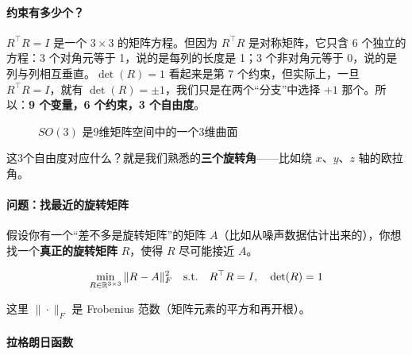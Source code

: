 \paragraph{约束有多少个？}

$R^\top R = I$ 是一个 $3 \times 3$ 的矩阵方程。但因为 $R^\top R$ 是对称矩阵，它只含 6 个独立的方程：3 个对角元等于 1，说的是每列的长度是 1；3 个非对角元等于 0，说的是列与列相互垂直。$\det(R) = 1$ 看起来是第 7 个约束，但实际上，一旦 $R^\top R = I$，就有 $\det(R) = \pm 1$，我们只是在两个“分支”中选择 $+1$ 那个。所以：\textbf{9 个变量，6 个约束，3 个自由度}。

\begin{figure}[htbp]
\centering
{}
\caption{$SO(3)$ 是9维矩阵空间中的一个3维曲面}
\end{figure}

这3个自由度对应什么？就是我们熟悉的\textbf{三个旋转角}——比如绕 $x$、$y$、$z$ 轴的欧拉角。

\paragraph{问题：找最近的旋转矩阵}

假设你有一个“差不多是旋转矩阵”的矩阵 $A$（比如从噪声数据估计出来的），你想找一个\textbf{真正的旋转矩阵} $R$，使得 $R$ 尽可能接近 $A$。

\begin{equation}
\min_{R \in \mathbb{R}^{3 \times 3}} \|R - A\|_F^2 \quad \text{s.t.} \quad R^\top R = I, \quad \det(R) = 1
\end{equation}

这里 $\|\cdot\|_F$ 是 Frobenius 范数（矩阵元素的平方和再开根）。

\paragraph{拉格朗日函数}

